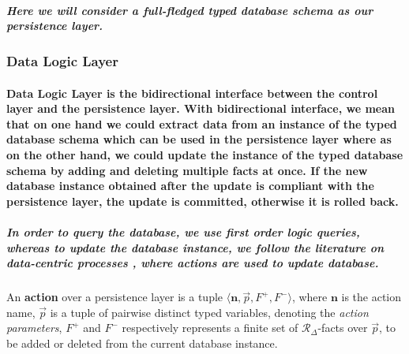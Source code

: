 \subparagraph*{\textnormal{Here we will consider a full-fledged typed database schema as our persistence layer.}}
\subsubsection{Data Logic Layer}
\paragraph*{\textnormal{Data Logic Layer is the bidirectional interface between the control layer and the persistence layer. With bidirectional interface, we mean that on one hand we could extract data from an instance of the typed database schema which can be used in the persistence layer where as on the other hand, we could update the instance of the typed database schema by adding and deleting multiple facts at once. If the new database instance obtained after the update is compliant with the persistence layer, the update is committed, otherwise it is rolled back.}}

\subparagraph*{\textnormal{In order to query the database, we use first order logic queries, whereas to update the database instance, we follow the literature on data-centric processes \cite{DBLP:conf/icdt/Vianu09,DBLP:conf/pods/CalvaneseGM13}, where \textit{actions} are used to update database.}}

\begin{defs}
	An \textbf{action} over a persistence layer is a tuple $\mathit{\langle \textbf{n},\vec{p},F^{+},F^{-}\rangle}$, where $\mathit{\textbf{n}}$ is the action name, $\mathit{\vec{p}}$ is a tuple of pairwise distinct typed variables, denoting the \textit{action parameters}, $\mathit{F^{+}}$ and $\mathit{F^{-}}$ respectively represents a finite set of $\mathit{\mathcal{R}_{\Delta}}$-facts over $\mathit{\vec{p}}$, to be added or deleted from the current database instance.
\end{defs}

